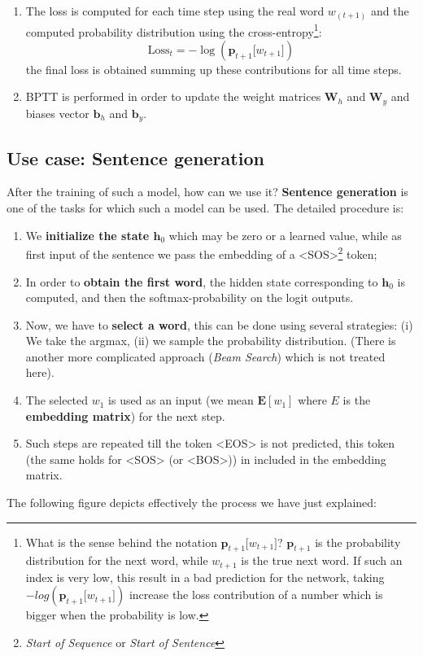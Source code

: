 \begin{multicols}{2}
\begin{enumerate}
        \item[\ding{204}] The loss is computed for each time step using the real word $w_{(t+1)}$ and the computed probability distribution using the cross-entropy\footnote{
            What is the sense behind the notation $\mathbf{p}_{t+1}\mathbf[w_{t+1}]$? $\mathbf{p}_{t+1}$ is the probability distribution for the next word, while $w_{t+1}$ is the true next word. If such an index is very low, this result in a bad prediction for the network, taking $-log(\mathbf{p}_{t+1}\mathbf[w_{t+1}])$ increase the loss contribution of a number which is bigger when the probability is low.
        }:
        \begin{equation}
            \text{Loss}_t = -\log(\mathbf{p}_{t+1}\mathbf[w_{t+1}])            
        \end{equation}
        the final loss is obtained summing up these contributions for all time steps.
        \item[\ding{204}] BPTT is performed in order to update the weight matrices $\mathbf{W}_h$ and $\mathbf{W}_y$ and biases vector $\mathbf{b}_h$ and $\mathbf{b}_y$. 
    \end{enumerate}
\end{multicols}

\subsection{Use case: Sentence generation}
After the training of such a model, how can we use it? \textbf{Sentence generation} is one of the tasks for which such a model can be used. The detailed procedure is: 
\begin{enumerate}
    \itemsep-0.2em
    \item We \textbf{initialize the state $\mathbf{h}_0$} which may be zero or a learned value, while as first input of the sentence we pass the embedding of a <SOS>\footnote{
        \textit{Start of Sequence} or \textit{Start of Sentence}
    } token; 
    \item In order to \textbf{obtain the first word}, the hidden state corresponding to $\mathbf{h}_0$ is computed, and then the softmax-probability on the logit outputs.
    \item Now, we have  to \textbf{select a word}, this can be done using several strategies: (i) We take the argmax, (ii) we sample the probability distribution. (There is another more complicated approach (\textit{Beam Search}) which is not treated here).
    \item The selected $w_1$ is used as an input (we mean $\mathbf{E}[w_1]$ where $E$ is the \textbf{embedding matrix}) for the next step.
    \item Such steps are repeated till the token <EOS> is not predicted, this token (the same holds for <SOS> (or <BOS>)) in included in the embedding matrix.
\end{enumerate}
The following figure depicts effectively the process we have just explained: 

